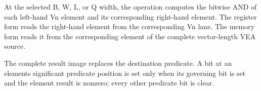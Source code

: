At the selected B, W, L, or Q width, the operation computes the bitwise AND of
each left-hand Vn element and its corresponding right-hand element. The
register form reads the right-hand element from the corresponding Vn lane. The
memory form reads it from the corresponding element of the complete
vector-length VEA source.

The complete result image replaces the destination predicate. A bit at an
element\textquotesingle{}s significant predicate position is set only when its governing bit is
set and the element result is nonzero; every other predicate bit is clear.
